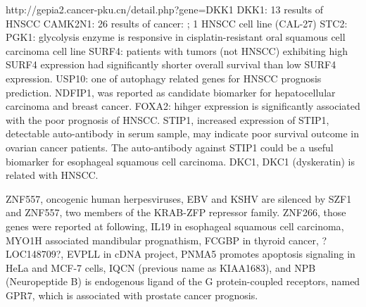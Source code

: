\documentclass[preprint,12pt]{elsarticle}
\begin{document}
http://gepia2.cancer-pku.cn/detail.php?gene=DKK1
DKK1: 13 results of HNSCC \cite{Shi2014}\cite{Gao2018}\cite{Chakraborty2020}\cite{Hu2020}\cite{Wei2020}
CAMK2N1: 26 results of cancer: ; 1 HNSCC cell line (CAL-27)\cite{Li2018b}
STC2: \cite{Ma2020}
PGK1: glycolysis enzyme is responsive in cisplatin-resistant oral squamous cell carcinoma cell line\cite{Nakamura2005}
SURF4: patients with tumors (not HNSCC) exhibiting high SURF4 expression had significantly shorter overall survival than low SURF4 expression.\cite{Kim2018a}
USP10: one of autophagy related genes for HNSCC prognosis prediction.\cite{Ren2020}
NDFIP1, was reported as candidate biomarker for hepatocellular carcinoma\cite{Zhang2019a} and breast cancer\cite{Tian2020}.
FOXA2: hihger expression is significantly associated with the poor prognosis of HNSCC\cite{Shen2017a}.
STIP1, increased expression of STIP1, detectable auto-antibody in serum sample, may indicate poor survival outcome in ovarian cancer patients\cite{Chao2013}\cite{Cho2014}. The auto-antibody against STIP1 could be a useful biomarker for esophageal squamous cell carcinoma\cite{Xu2017}.
DKC1, DKC1 (dyskeratin) is related with HNSCC\cite{Smith2010}.

ZNF557, oncogenic human herpesviruses, EBV and KSHV are silenced by SZF1 and ZNF557, two members of the KRAB-ZFP repressor family\cite{Li2018c}.
ZNF266, %
those genes were reported at following, 
IL19 in esophageal squamous cell carcinoma\cite{Hsing2013},
MYO1H associated mandibular prognathism\cite{Sun2018}, 
FCGBP in thyroid cancer\cite{Griffith2006}, 
?LOC148709?, 
EVPLL in cDNA project,
PNMA5 promotes apoptosis signaling in HeLa and MCF-7 cells\cite{Lee2016}, 
IQCN (previous name as KIAA1683), and 
NPB (Neuropeptide B) is endogenous ligand of the G protein-coupled receptors, named GPR7\cite{Andreis2005}, which is associated with prostate cancer prognosis\cite{Cottrell2007}. 
\end{document}
